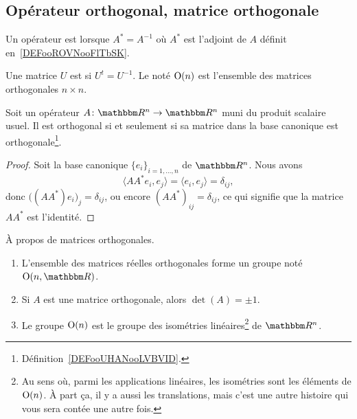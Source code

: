 \subsection{Opérateur orthogonal, matrice orthogonale}

\begin{definition}      \label{DEFooYKCSooURQDoS}
    Un opérateur est  lorsque \( A^*=A^{-1}\) où \( A^*\) est l'adjoint de \( A\) définit en~\ref{DEFooROVNooFlTbSK}.
\end{definition}

\begin{definition}      \label{DEFooUHANooLVBVID}
    Une matrice \( U\) est  si \( U^t=U^{-1}\). Le  noté \( \operatorname{O}(n)\) est l'ensemble des matrices orthogonales \( n\times n\).
\end{definition}

\begin{lemma}       \label{LEMooSSALooSBFzJb}
    Soit un opérateur \( A\colon \eR^n\to \eR^n\) muni du produit scalaire usuel. Il est orthogonal si et seulement si sa matrice dans la base canonique est orthogonale\footnote{Définition~\ref{DEFooUHANooLVBVID}.}.
\end{lemma}

\begin{proof}
    Soit la base canonique \( \{ e_i \}_{i=1,\ldots, n}\) de \( \eR^n\). Nous avons
    \begin{equation}
        \langle AA^*e_i, e_j\rangle =\langle e_i, e_j\rangle =\delta_{ij},
    \end{equation}
    donc \( \big( (AA^*)e_i \big)_j=\delta_{ij}\), ou encore \( (AA^*)_{ij}=\delta_{ij}\), ce qui signifie que la matrice $AA^*$ est l'identité.
\end{proof}

\begin{proposition}     \label{PropKBCXooOuEZcS}
    À propos de matrices orthogonales.
    \begin{enumerate}
        \item
            L'ensemble des matrices réelles orthogonales forme un groupe noté \( \gO(n,\eR)\).
        \item
            Si \( A\) est une matrice orthogonale, alors \( \det(A)=\pm 1\).
        \item       \label{ITEMooOWMBooHUatNb}
            Le groupe \( \operatorname{O}(n)\) est le groupe des isométries linéaires\footnote{Au sens où, parmi les applications linéaires, les isométries sont les éléments de \( \operatorname{O}(n)\). À part ça, il y a aussi les translations, mais c'est une autre histoire qui vous sera contée une autre fois.} de \( \eR^n\).
    \end{enumerate}
\end{proposition}

